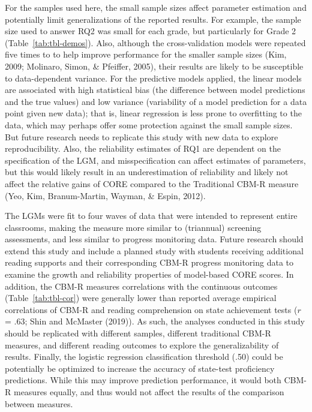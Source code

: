 \documentclass[
  english,
  man, fleqn, noextraspace]{apa6}
\begin{document}
For the samples used here, the small sample sizes affect parameter estimation and potentially limit generalizations of the reported results. For example, the sample size used to answer RQ2 was small for each grade, but particularly for Grade 2 (Table~\ref{tab:tbl-demos}). Also, although the cross-validation models were repeated five times to to help improve performance for the smaller sample sizes (Kim, 2009; Molinaro, Simon, \& Pfeiffer, 2005), their results are likely to be susceptible to data-dependent variance. For the predictive models applied, the linear models are associated with high statistical bias (the difference between model predictions and the true values) and low variance (variability of a model prediction for a data point given new data); that is, linear regression is less prone to overfitting to the data, which may perhaps offer some protection against the small sample sizes. But future research needs to replicate this study with new data to explore reproducibility. Also, the reliability estimates of RQ1 are dependent on the specification of the LGM, and misspecification can affect estimates of parameters, but this would likely result in an underestimation of reliability and likely not affect the relative gains of CORE compared to the Traditional CBM-R measure (Yeo, Kim, Branum-Martin, Wayman, \& Espin, 2012).

The LGMs were fit to four waves of data that were intended to represent entire classrooms, making the measure more similar to (triannual) screening assessments, and less similar to progress monitoring data. Future research should extend this study and include a planned study with students receiving additional reading supports and their corresponding CBM-R progress monitoring data to examine the growth and reliability properties of model-based CORE scores. In addition, the CBM-R measures correlations with the continuous outcomes (Table~\ref{tab:tbl-cor}) were generally lower than reported average empirical correlations of CBM-R and reading comprehension on state achievement tests (\(r\) = .63; Shin and McMaster (2019)). As such, the analyses conducted in this study should be replicated with different samples, different traditional CBM-R measures, and different reading outcomes to explore the generalizability of results. Finally, the logistic regression classification threshold (.50) could be potentially be optimized to increase the accuracy of state-test proficiency predictions. While this may improve prediction performance, it would both CBM-R measures equally, and thus would not affect the results of the comparison between measures.
\end{document}
